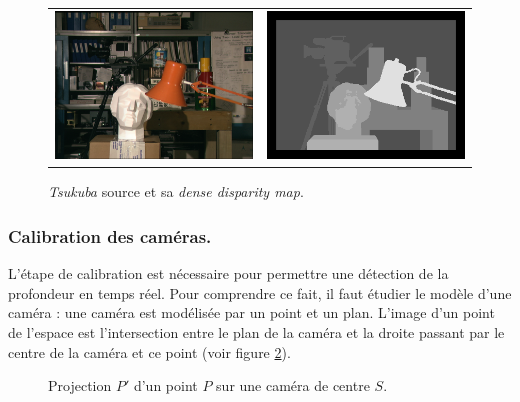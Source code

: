 \documentclass{article}
\begin{document}
\begin{figure}
    \begin{center}
        \begin{tabular}{cc}
            \includegraphics[width=0.4\linewidth]{rcs/tsukuba.png} & \includegraphics[width=0.4\linewidth]{rcs/tsukuba_disp.png} \\
        \end{tabular}
    \end{center}
    \caption{\emph{Tsukuba} source et sa \emph{dense disparity map}.}
    \label{disparity}
\end{figure}

\subsubsection{Calibration des caméras.}
L'étape de calibration est nécessaire pour permettre une détection de la profondeur en temps réel. Pour comprendre ce fait, il faut étudier le modèle d'une caméra : une caméra est modélisée par un point et un plan. L'image d'un point de l'espace est l'intersection entre le plan de la caméra et la droite passant par le centre de la caméra et ce point (voir figure \ref{projection}).

\begin{figure}
    \begin{center}
    \end{center}
    \caption{Projection $P'$ d'un point $P$ sur une caméra de centre $S$.}
    \label{projection}
\end{figure}
\end{document}
